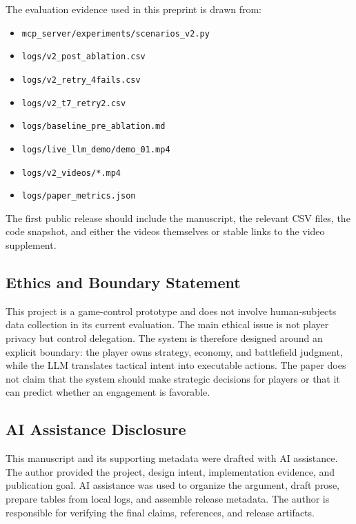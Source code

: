 \documentclass[
  journal]{IEEEtran}
\providecommand{\tightlist}{%
  \setlength{\itemsep}{0pt}\setlength{\parskip}{0pt}}
\begin{document}
The evaluation evidence used in this preprint is drawn from:

\begin{itemize}
\tightlist
\item
  \texttt{mcp\_server/experiments/scenarios\_v2.py}
\item
  \texttt{logs/v2\_post\_ablation.csv}
\item
  \texttt{logs/v2\_retry\_4fails.csv}
\item
  \texttt{logs/v2\_t7\_retry2.csv}
\item
  \texttt{logs/baseline\_pre\_ablation.md}
\item
  \texttt{logs/live\_llm\_demo/demo\_01.mp4}
\item
  \texttt{logs/v2\_videos/*.mp4}
\item
  \texttt{logs/paper\_metrics.json}
\end{itemize}

The first public release should include the manuscript, the relevant CSV
files, the code snapshot, and either the videos themselves or stable
links to the video supplement.

\subsection{Ethics and Boundary
Statement}\label{ethics-and-boundary-statement}

This project is a game-control prototype and does not involve
human-subjects data collection in its current evaluation. The main
ethical issue is not player privacy but control delegation. The system
is therefore designed around an explicit boundary: the player owns
strategy, economy, and battlefield judgment, while the LLM translates
tactical intent into executable actions. The paper does not claim that
the system should make strategic decisions for players or that it can
predict whether an engagement is favorable.

\subsection{AI Assistance Disclosure}\label{ai-assistance-disclosure}

This manuscript and its supporting metadata were drafted with AI
assistance. The author provided the project, design intent,
implementation evidence, and publication goal. AI assistance was used to
organize the argument, draft prose, prepare tables from local logs, and
assemble release metadata. The author is responsible for verifying the
final claims, references, and release artifacts.
\end{document}
